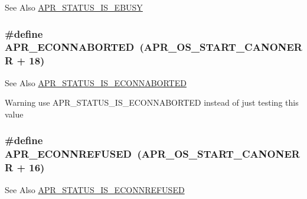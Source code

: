 \begin{DoxySeeAlso}{See Also}
\hyperlink{group___a_p_r___s_t_a_t_u_s___i_s_gabb92ad7b6ef304132de70e9e5cbaa896}{A\-P\-R\-\_\-\-S\-T\-A\-T\-U\-S\-\_\-\-I\-S\-\_\-\-E\-B\-U\-S\-Y} 
\end{DoxySeeAlso}
\hypertarget{group___a_p_r___error_ga9458da18e0ee46a5d37c9cdfdc43efd2}{
\subsubsection[{A\-P\-R\-\_\-\-E\-C\-O\-N\-N\-A\-B\-O\-R\-T\-E\-D}]{\setlength{\rightskip}{0pt plus 5cm}\#define A\-P\-R\-\_\-\-E\-C\-O\-N\-N\-A\-B\-O\-R\-T\-E\-D~({\bf A\-P\-R\-\_\-\-O\-S\-\_\-\-S\-T\-A\-R\-T\-\_\-\-C\-A\-N\-O\-N\-E\-R\-R} + 18)}}\label{group___a_p_r___error_ga9458da18e0ee46a5d37c9cdfdc43efd2}
\begin{DoxySeeAlso}{See Also}
\hyperlink{group___a_p_r___s_t_a_t_u_s___i_s_ga528a8032b13c75fbdeb9bf7e4c0be493}{A\-P\-R\-\_\-\-S\-T\-A\-T\-U\-S\-\_\-\-I\-S\-\_\-\-E\-C\-O\-N\-N\-A\-B\-O\-R\-T\-E\-D} 
\end{DoxySeeAlso}
\begin{DoxyWarning}{Warning}
use A\-P\-R\-\_\-\-S\-T\-A\-T\-U\-S\-\_\-\-I\-S\-\_\-\-E\-C\-O\-N\-N\-A\-B\-O\-R\-T\-E\-D instead of just testing this value 
\end{DoxyWarning}
\hypertarget{group___a_p_r___error_ga1b4d1d847bebdfc48af343bc2486ecb8}{
\subsubsection[{A\-P\-R\-\_\-\-E\-C\-O\-N\-N\-R\-E\-F\-U\-S\-E\-D}]{\setlength{\rightskip}{0pt plus 5cm}\#define A\-P\-R\-\_\-\-E\-C\-O\-N\-N\-R\-E\-F\-U\-S\-E\-D~({\bf A\-P\-R\-\_\-\-O\-S\-\_\-\-S\-T\-A\-R\-T\-\_\-\-C\-A\-N\-O\-N\-E\-R\-R} + 16)}}\label{group___a_p_r___error_ga1b4d1d847bebdfc48af343bc2486ecb8}
\begin{DoxySeeAlso}{See Also}
\hyperlink{group___a_p_r___s_t_a_t_u_s___i_s_ga4decf55c5cea9660a44fed0c74265ee6}{A\-P\-R\-\_\-\-S\-T\-A\-T\-U\-S\-\_\-\-I\-S\-\_\-\-E\-C\-O\-N\-N\-R\-E\-F\-U\-S\-E\-D} 
\end{DoxySeeAlso}
